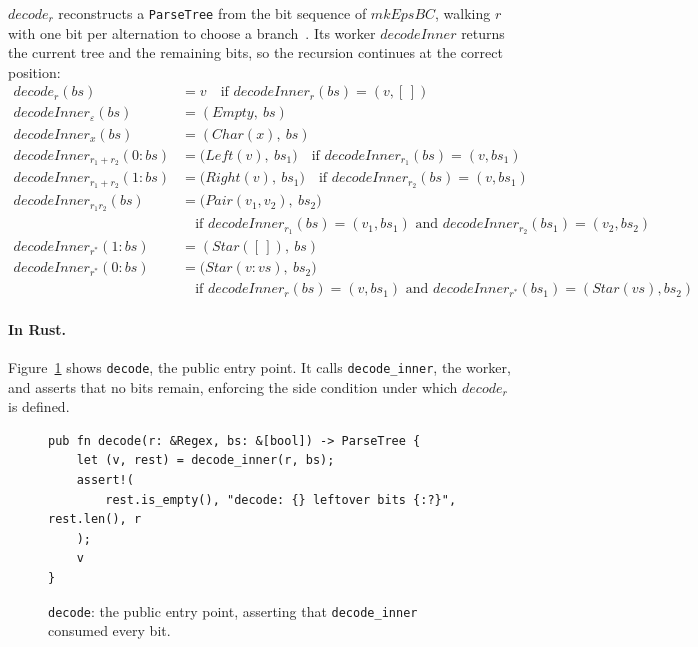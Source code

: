 $\mathit{decode}_r$ reconstructs a \texttt{ParseTree} 
from the bit sequence of $\mathit{mkEpsBC}$, 
walking $r$ with one bit per alternation 
to choose a branch~\citep[Fig.~4]{sulzmannlu2014}.
Its worker $\mathit{decodeInner}$ returns the current tree 
and the remaining bits, so the recursion continues at the correct position:
{\small
\begin{equation}\label{eq:decode}
\begin{aligned}
\mathit{decode}_r(bs) &= v \quad\text{if } \mathit{decodeInner}_r(bs)=(v,[\,]) \\[0.8em]
\mathit{decodeInner}_{\varepsilon}(bs)
  &= (\mathit{Empty},\ bs) \\
\mathit{decodeInner}_{x}(bs)
  &= (\mathit{Char}(x),\ bs) \\
\mathit{decodeInner}_{r_1+r_2}(0{:}bs)
  &= \bigl(\mathit{Left}(v),\ bs_1\bigr)
  \quad\text{if } \mathit{decodeInner}_{r_1}(bs)=(v,bs_1) \\
\mathit{decodeInner}_{r_1+r_2}(1{:}bs)
  &= \bigl(\mathit{Right}(v),\ bs_1\bigr)
  \quad\text{if } \mathit{decodeInner}_{r_2}(bs)=(v,bs_1) \\[4pt]
\mathit{decodeInner}_{r_1r_2}(bs)
  &= \bigl(\mathit{Pair}(v_1,v_2),\ bs_2\bigr) \\
  &\quad\text{if } \mathit{decodeInner}_{r_1}(bs)=(v_1,bs_1)
    \text{ and } \mathit{decodeInner}_{r_2}(bs_1)=(v_2,bs_2) \\[4pt]
\mathit{decodeInner}_{r^{*}}(1{:}bs)
  &= (\mathit{Star}([\,]),\ bs) \\
\mathit{decodeInner}_{r^{*}}(0{:}bs)
  &= \bigl(\mathit{Star}(v{:}vs),\ bs_2\bigr) \\
  &\quad\text{if } \mathit{decodeInner}_{r}(bs)=(v,bs_1)
    \text{ and } \mathit{decodeInner}_{r^{*}}(bs_1)=(\mathit{Star}(vs),bs_2)
\end{aligned}
\end{equation}
}

%

\paragraph{In Rust.}
Figure~\ref{fig:decode-rust} shows \texttt{decode}, 
the public entry point. 
It calls \texttt{decode\_inner}, the worker,
and asserts that no bits remain, enforcing the side condition 
under which $\mathit{decode}_r$ is defined.
\begin{figure}[H]
\small
\begin{verbatim}
pub fn decode(r: &Regex, bs: &[bool]) -> ParseTree {
    let (v, rest) = decode_inner(r, bs);
    assert!(
        rest.is_empty(), "decode: {} leftover bits {:?}", rest.len(), r
    );
    v
}
\end{verbatim}
\caption{\texttt{decode}: the public entry point, asserting that
\texttt{decode\_inner} consumed every bit.}
\label{fig:decode-rust}
\end{figure}

